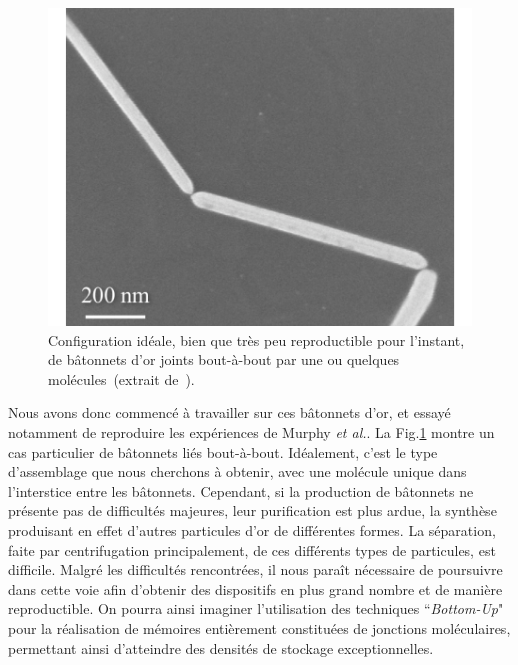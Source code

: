 \begin{figure}[h!]
\parbox{7cm}{
\includegraphics[scale=0.45]{Conclusion/BottomUp/BottomUp.pdf} 
}
\parbox{6.5cm}{\caption{Configuration idéale, bien que très peu reproductible pour l'instant,
de bâtonnets d'or joints bout-à-bout par une ou quelques molécules~(extrait de~\cite{Liatard2012}).}
\label{BottomUpConclu}
}
\end{figure}

Nous avons donc commencé à travailler sur ces bâtonnets d'or, et essayé notamment de reproduire les expériences de Murphy \textit{et al.}. La Fig.\ref{BottomUpConclu} montre un cas particulier de bâtonnets liés bout-à-bout. Idéalement, c'est le type d'assemblage que nous cherchons à obtenir, avec une molécule unique dans l'interstice entre les bâtonnets. Cependant, si la production de bâtonnets ne présente pas de difficultés majeures, leur purification est plus ardue, la synthèse produisant en effet d'autres particules d'or de différentes formes. La séparation, faite par centrifugation principalement, de ces différents types de particules, est difficile. Malgré les difficultés rencontrées, il nous paraît nécessaire de poursuivre dans cette voie afin d’obtenir des dispositifs en plus grand nombre et de manière reproductible. On pourra ainsi imaginer l’utilisation des techniques ``\textit{Bottom-Up}" pour la réalisation de mémoires entièrement constituées de jonctions moléculaires, permettant ainsi d’atteindre des densités de stockage exceptionnelles.


